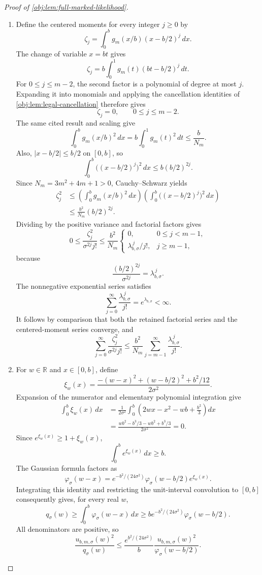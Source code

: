 \documentclass[11pt]{article}
\begin{document}
\begin{proof}[Proof of \cref{obj:lem:full-marked-likelihood}]
\begin{enumerate}
\item Define the centered moments for every integer \(j\ge0\) by
\[
\zeta_j
=
\int_0^b g_m(x/b)(x-b/2)^j\,dx.
\]
The change of variable \(x=bt\) gives
\[
\zeta_j
=b\int_0^1g_m(t)(bt-b/2)^j\,dt.
\]
For \(0\le j\le m-2\), the second factor is a polynomial of degree at most \(j\). Expanding it into monomials and applying the cancellation identities of \cref{obj:lem:legal-cancellation} therefore gives
\[
\zeta_j=0,\qquad 0\le j\le m-2.
\]
The same cited result and scaling give
\[
\int_0^b g_m(x/b)^2\,dx
=b\int_0^1g_m(t)^2\,dt
\le\frac b{N_m}.
\]
Also, \(|x-b/2|\le b/2\) on \([0,b]\), so
\[
\int_0^b\bigl((x-b/2)^j\bigr)^2\,dx
\le b(b/2)^{2j}.
\]
Since \(N_m=3m^2+4m+1>0\), Cauchy--Schwarz yields
\[
\begin{aligned}
\zeta_j^2
&\le
\left(\int_0^b g_m(x/b)^2\,dx\right)
\left(\int_0^b\bigl((x-b/2)^j\bigr)^2\,dx\right)\\
&\le\frac{b^2}{N_m}(b/2)^{2j}.
\end{aligned}
\]
Dividing by the positive variance and factorial factors gives
\[
0\le\frac{\zeta_j^2}{\sigma^{2j}j!}
\le
\frac{b^2}{N_m}
\begin{cases}
0,&0\le j<m-1,\\
\lambda_{b,\sigma}^{\,j}/j!,&j\ge m-1,
\end{cases}
\]
because
\[
\frac{(b/2)^{2j}}{\sigma^{2j}}
=\lambda_{b,\sigma}^{\,j}.
\]
The nonnegative exponential series satisfies
\[
\sum_{j=0}^{\infty}\frac{\lambda_{b,\sigma}^{\,j}}{j!}
=e^{\lambda_{b,\sigma}}<\infty.
\]
It follows by comparison that both the retained factorial series and the centered-moment series converge, and
\[
\sum_{j=0}^{\infty}\frac{\zeta_j^2}{\sigma^{2j}j!}
\le
\frac{b^2}{N_m}
\sum_{j=m-1}^{\infty}\frac{\lambda_{b,\sigma}^{\,j}}{j!}.
\]

\item For \(w\in\mathbb R\) and \(x\in[0,b]\), define
\[
\xi_w(x)
=
\frac{-(w-x)^2+(w-b/2)^2+b^2/12}{2\sigma^2}.
\]
Expansion of the numerator and elementary polynomial integration give
\[
\begin{aligned}
\int_0^b\xi_w(x)\,dx
&=\frac1{2\sigma^2}
  \int_0^b\left(2wx-x^2-wb+\frac{b^2}{3}\right)dx\\
&=\frac{wb^2-b^3/3-wb^2+b^3/3}{2\sigma^2}
=0.
\end{aligned}
\]
Since \(e^{\xi_w(x)}\ge1+\xi_w(x)\),
\[
\int_0^b e^{\xi_w(x)}\,dx\ge b.
\]
The Gaussian formula factors as
\[
\varphi_\sigma(w-x)
=
e^{-b^2/(24\sigma^2)}
\varphi_\sigma(w-b/2)e^{\xi_w(x)}.
\]
Integrating this identity and restricting the unit-interval convolution to \([0,b]\) consequently gives, for every real \(w\),
\[
q_\sigma(w)
\ge\int_0^b\varphi_\sigma(w-x)\,dx
\ge
b e^{-b^2/(24\sigma^2)}\varphi_\sigma(w-b/2).
\]
All denominators are positive, so
\[
\frac{u_{b,m,\sigma}(w)^2}{q_\sigma(w)}
\le
\frac{e^{b^2/(24\sigma^2)}}b
\frac{u_{b,m,\sigma}(w)^2}{\varphi_\sigma(w-b/2)}.
\]


\end{enumerate}
\end{proof}
\end{document}

